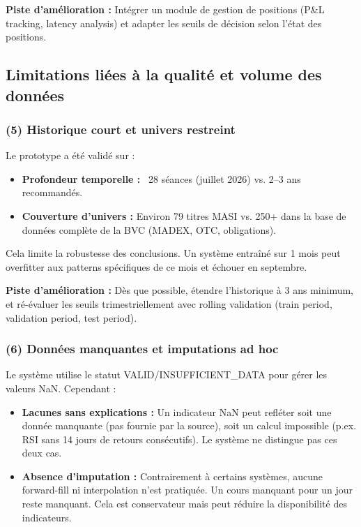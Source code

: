 \documentclass{rapportENSIAS} %
\begin{document}
\vspace{0.2cm}
\noindent
\textbf{Piste d'amélioration :} Intégrer un module de gestion de positions (P\&L tracking, latency analysis) et adapter les seuils de décision selon l'état des positions.

\subsection{Limitations liées à la qualité et volume des données}

\noindent
\subsubsection*{(5) Historique court et univers restreint}

\noindent
Le prototype a été validé sur :
\begin{itemize}
    \item \textbf{Profondeur temporelle :} ~28 séances (juillet 2026) vs. 2–3 ans recommandés.
    \item \textbf{Couverture d'univers :} Environ 79 titres MASI vs. 250+ dans la base de données complète de la BVC (MADEX, OTC, obligations).
\end{itemize}

\noindent
Cela limite la robustesse des conclusions. Un système entraîné sur 1 mois peut overfitter aux patterns spécifiques de ce mois et échouer en septembre.

\vspace{0.2cm}
\noindent
\textbf{Piste d'amélioration :} Dès que possible, étendre l'historique à 3 ans minimum, et ré-évaluer les seuils trimestriellement avec rolling validation (train period, validation period, test period).

\subsubsection*{(6) Données manquantes et imputations ad hoc}

\noindent
Le système utilise le statut VALID/INSUFFICIENT\_DATA pour gérer les valeurs NaN. Cependant :
\begin{itemize}
    \item \textbf{Lacunes sans explications :} Un indicateur NaN peut refléter soit une donnée manquante (pas fournie par la source), soit un calcul impossible (p.ex. RSI sans 14 jours de retours consécutifs). Le système ne distingue pas ces deux cas.
    \item \textbf{Absence d'imputation :} Contrairement à certains systèmes, aucune forward-fill ni interpolation n'est pratiquée. Un cours manquant pour un jour reste manquant. Cela est conservateur mais peut réduire la disponibilité des indicateurs.
\end{itemize}
\end{document}

